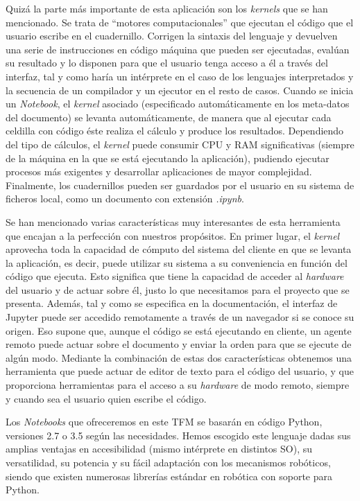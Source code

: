 Quizá la parte más importante de esta aplicación son los \textit{kernels} que se han mencionado. Se trata de ``motores computacionales'' que ejecutan el código que el usuario escribe en el cuadernillo. Corrigen la sintaxis del lenguaje y devuelven una serie de instrucciones en código máquina que pueden ser ejecutadas, evalúan su resultado y lo disponen para que el usuario tenga acceso a él a través del interfaz, tal y como haría un intérprete en el caso de los lenguajes interpretados y la secuencia de un compilador y un ejecutor en el resto de casos. Cuando se inicia un \textit{Notebook}, el \textit{kernel} asociado (especificado automáticamente en los meta-datos del documento) se levanta automáticamente, de manera que al ejecutar cada celdilla con código éste realiza el cálculo y produce los resultados. Dependiendo del tipo de cálculos, el \textit{kernel}
puede consumir CPU y RAM significativas (siempre de la máquina en la que se está ejecutando la aplicación), pudiendo ejecutar procesos más exigentes y desarrollar aplicaciones de mayor complejidad. Finalmente, los cuadernillos pueden ser guardados por el usuario en su sistema de ficheros local, como un documento con extensión \textit{.ipynb}.

Se han mencionado varias características muy interesantes de esta herramienta que encajan a la perfección con nuestros propósitos. En primer lugar, el \textit{kernel} aprovecha toda la capacidad de cómputo del sistema del cliente en que se levanta la aplicación, es decir, puede utilizar su sistema a su conveniencia en función del código que ejecuta. Esto significa que tiene la capacidad de acceder al \textit{hardware} del usuario y de actuar sobre él, justo lo que necesitamos para el proyecto que se presenta. Además, tal y como se especifica en la documentación, el interfaz de Jupyter puede ser accedido remotamente a través de un navegador si se conoce su origen. Eso supone que, aunque el código se está ejecutando en cliente, un agente remoto puede actuar sobre el documento y enviar la orden para que se ejecute de algún modo. Mediante la combinación de estas dos características obtenemos una herramienta que puede actuar de editor de texto para el código del usuario, y que proporciona herramientas para el acceso a su \textit{hardware} de modo remoto, siempre y cuando sea el usuario quien escribe el código. 

Los \textit{Notebooks} que ofreceremos en este TFM se basarán en código Python, versiones 2.7 o 3.5 según las necesidades. Hemos escogido este lenguaje dadas sus amplias ventajas en accesibilidad (mismo intérprete en distintos SO), su versatilidad, su potencia y su fácil adaptación con los mecanismos robóticos, siendo que existen numerosas librerías estándar en robótica con soporte para Python.


